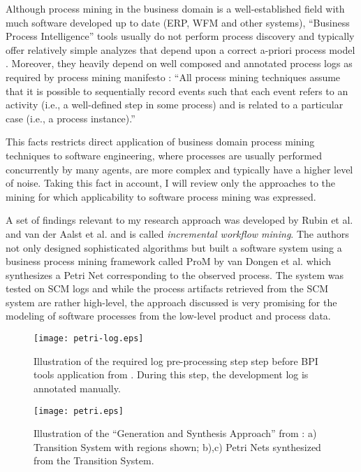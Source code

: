 Although process mining in the business domain is a well-established field with 
much software developed up to date (ERP, WFM and other systems), 
``Business Process Intelligence'' tools usually do not perform process discovery
and typically offer relatively simple analyzes that depend upon a correct
a-priori process model \cite{citeulike:3718014} \cite{citeulike:5044991}.
Moreover, they heavily depend on well composed and annotated process logs as
required by process mining manifesto \cite{citeulike:11077707}:
``All process mining techniques assume that it is possible to sequentially 
record events such that each event refers to an activity (i.e., a well-defined 
step in some process) and is related to a particular case (i.e., a process instance).''

This facts restricts direct application of business domain process mining techniques
to software engineering, where processes are usually performed concurrently by
many agents, are more complex and typically have a higher level of noise. Taking
this fact in account, I will review only the approaches to the mining for which
applicability to software process mining was expressed. 

A set of findings relevant to my research approach was developed by Rubin
et al. \cite{citeulike:1885717} and van der Aalst et al.
\cite{citeulike:3718014} and is called \textit{incremental workflow mining}. The
authors not only designed sophisticated algorithms but built a software system
using a business process mining framework called ProM by van Dongen et al.
\cite{citeulike:5043673} which synthesizes a Petri Net corresponding to the
observed process. The system was tested on SCM logs and while the process
artifacts retrieved from the SCM system are rather high-level, the approach
discussed is very promising for the modeling of software processes from the
low-level product and process data.

\begin{figure}[tbp]
   \centering
   \texttt{[image: petri-log.eps]}
   \caption{Illustration of the required log pre-processing step step 
before BPI tools application from \cite{citeulike:1885717}. During this step,
the development log is annotated manually.}
   \label{fig:petri-log}
\end{figure}

\begin{figure}[tbp]
   \centering
   \texttt{[image: petri.eps]}
   \caption{Illustration of the ``Generation and Synthesis Approach'' from
\cite{citeulike:5043673}: a) Transition System with regions shown; b),c) Petri
Nets synthesized from the Transition System.}
   \label{fig:petri}
\end{figure}

